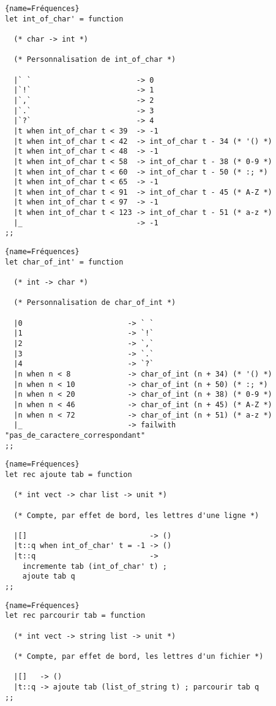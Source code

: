 \documentclass[10pt,twoside,a4paper]{article}
\begin{document}
\begin{lstlisting}{name=Fréquences}
let int_of_char' = function

  (* char -> int *)

  (* Personnalisation de int_of_char *)

  |` `                        -> 0
  |`!`                        -> 1
  |`,`                        -> 2
  |`.`                        -> 3
  |`?`                        -> 4
  |t when int_of_char t < 39  -> -1
  |t when int_of_char t < 42  -> int_of_char t - 34 (* '() *)
  |t when int_of_char t < 48  -> -1
  |t when int_of_char t < 58  -> int_of_char t - 38 (* 0-9 *)
  |t when int_of_char t < 60  -> int_of_char t - 50 (* :; *)
  |t when int_of_char t < 65  -> -1
  |t when int_of_char t < 91  -> int_of_char t - 45 (* A-Z *)
  |t when int_of_char t < 97  -> -1
  |t when int_of_char t < 123 -> int_of_char t - 51 (* a-z *)
  |_                          -> -1
;;
\end{lstlisting}
\pagebreak
\begin{lstlisting}{name=Fréquences}
let char_of_int' = function

  (* int -> char *)

  (* Personnalisation de char_of_int *)

  |0                        -> ` `
  |1                        -> `!`
  |2                        -> `,`
  |3                        -> `.`
  |4                        -> `?`
  |n when n < 8             -> char_of_int (n + 34) (* '() *)
  |n when n < 10            -> char_of_int (n + 50) (* :; *)
  |n when n < 20            -> char_of_int (n + 38) (* 0-9 *)
  |n when n < 46            -> char_of_int (n + 45) (* A-Z *)
  |n when n < 72            -> char_of_int (n + 51) (* a-z *)
  |_                        -> failwith "pas_de_caractere_correspondant"
;;
\end{lstlisting}

\begin{lstlisting}{name=Fréquences}
let rec ajoute tab = function

  (* int vect -> char list -> unit *)

  (* Compte, par effet de bord, les lettres d'une ligne *)

  |[]                            -> ()
  |t::q when int_of_char' t = -1 -> ()
  |t::q                          ->
    incremente tab (int_of_char' t) ;
    ajoute tab q
;;
\end{lstlisting}

\begin{lstlisting}{name=Fréquences}
let rec parcourir tab = function

  (* int vect -> string list -> unit *)

  (* Compte, par effet de bord, les lettres d'un fichier *)

  |[]   -> ()
  |t::q -> ajoute tab (list_of_string t) ; parcourir tab q
;;
\end{lstlisting}
\end{document}
